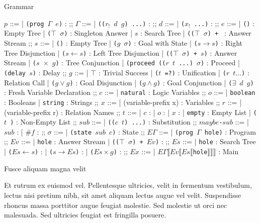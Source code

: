 \documentclass[final]{beamer}
\newlength{\colwidth}
\begin{document}
\begin{frame}[t]
\begin{columns}[t]
\begin{column}{\colwidth}
\begin{block}{Grammar}
    \begin{bnf}
$p$ ::=
| \texttt{(prog $\Gamma$ $e$)} :
;;
$\Gamma$ ::=
| \texttt{(($r_!$ $d$ $g$) ...)} :
;;
$d$ ::=
| \texttt{($x_!$ ...)} :
;;
$e$ ::=
| \texttt{()} : Empty Tree
| \texttt{($\top$ $\sigma$)} : Singleton Answer
| $s$ : Search Tree
| \texttt{(($\top$  $\sigma$) + } : Answer Stream
;;
$s$ ::=
| \texttt{()} : Empty Tree
| \texttt{($g$ $\sigma$)} : Goal with State
| \texttt{($s \rightarrow s$)} : Right Tree Disjunction
| \texttt{($s \leftarrow s$)} : Left Tree Disjunction
| \texttt{(($\top$ $\sigma$) + $s$)} : Answer Stream
| \texttt{($s$ $\times$ $g$)} : Tree Conjunction
| \texttt{(proceed (($r$ $t$ ...) $\sigma$)} : Proceed
| \texttt{(delay $s$)} : Delay
;;
$g$ ::= 
| $\top$ : Trivial Success
| \texttt{($t$ =?)} : Unification
| \texttt{($r$ $t ...$)} : Relation Call
| \texttt{($g \vee g$)} : Goal Disjunction
| \texttt{($g \wedge g$)} : Goal Conjunction
| \texttt{($\exists$ $d$ $g$)} : Fresh Variable Declaration
;;
$c$ ::=
| \texttt{natural} : Logic Variables
;;
$o$ ::=
| \texttt{boolean} : Booleans
| \texttt{string} :  Strings
;;
$x$ ::=
| (variable-prefix x) : Variables 
;;
$r$ ::=
| (variable-prefix r) : Relation Names
;;
$t$ ::=
| $c$ : 
| $o$ : 
| $x$ :
| \texttt{empty} : Empty List
| \texttt{($t$ )} : Non-Empty List
;;
$sub$ ::=
| \texttt{(($c$ $t$) ...)} : Substitution
;;
\texttt{$maybe$-$sub$} ::=
| $sub$ :
| $\#f$ :
;;
$\sigma$  ::=
| \texttt{(state $sub$ $c$)} : State
;;
$E\Gamma$ ::=
| \texttt{(prog $\Gamma$ hole)} : Program
;;
$Ev$ ::=
| \texttt{hole} : Answer Stream
| \texttt{(($\top$ $\sigma$) + $Ev$)} :
;;
$Es$ ::=
| \texttt{hole} : Search Tree
| \texttt{($Es \leftarrow s$)} :
| \texttt{($s \rightarrow Es$)} :
| \texttt{($Es \times g$)} :
;;
$Ex$ ::=
| \texttt{$E\Gamma$$\llbracket$$Ev$$\llbracket$$Es$$\llbracket$hole$\rrbracket$$\rrbracket$$\rrbracket$} : Main
\end{bnf}

  \end{block}

  \begin{block}{Fusce aliquam magna velit}

    Et rutrum ex euismod vel. Pellentesque ultricies, velit in fermentum
    vestibulum, lectus nisi pretium nibh, sit amet aliquam lectus augue vel
    velit. Suspendisse rhoncus massa porttitor augue feugiat molestie. Sed
    molestie ut orci nec malesuada. Sed ultricies feugiat est fringilla
    posuere.

\vspace{1em}


\end{block}
\end{column}
\end{columns}
\end{frame}
\end{document}
